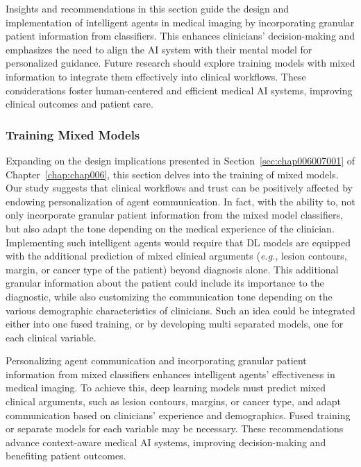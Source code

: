 Insights and recommendations in this section guide the design and implementation of intelligent agents in medical imaging by incorporating granular patient information from classifiers.
This enhances clinicians' decision-making and emphasizes the need to align the \ac{AI} system with their mental model for personalized guidance.
Future research should explore training models with mixed information to integrate them effectively into clinical workflows.
These considerations foster human-centered and efficient medical \ac{AI} systems, improving clinical outcomes and patient care.

\subsubsection{Training Mixed Models}
\label{sec:app005008001002}

Expanding on the design implications presented in Section~\ref{sec:chap006007001} of Chapter~\ref{chap:chap006}, this section delves into the training of mixed models.
Our study suggests that clinical workflows and trust can be positively affected by endowing personalization of agent communication.
In fact, with the ability to, not only incorporate granular patient information from the mixed model classifiers, but also adapt the tone depending on the medical experience of the clinician.
Implementing such intelligent agents would require that \ac{DL} models are equipped with the additional prediction of mixed clinical arguments ({\it e.g.}, lesion contours, margin, or cancer type of the patient) beyond diagnosis alone.
This additional granular information about the patient could include its importance to the diagnostic, while also customizing the communication tone depending on the various demographic characteristics of clinicians.
Such an idea could be integrated either into one fused training, or by developing multi separated models, one for each clinical variable.

Personalizing agent communication and incorporating granular patient information from mixed classifiers enhances intelligent agents' effectiveness in medical imaging.
To achieve this, deep learning models must predict mixed clinical arguments, such as lesion contours, margins, or cancer type, and adapt communication based on clinicians' experience and demographics.
Fused training or separate models for each variable may be necessary.
These recommendations advance context-aware medical \ac{AI} systems, improving decision-making and benefiting patient outcomes.


